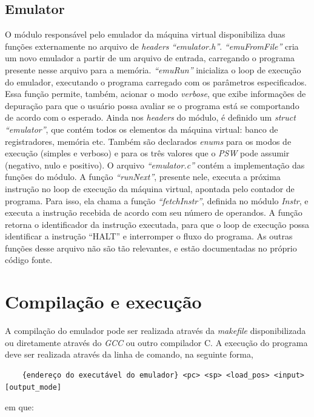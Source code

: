 \documentclass[10pt,a4paper]{article}
\numberwithin{equation}{section}
\begin{document}
\subsection{Emulator}

O módulo responsável pelo emulador da máquina virtual disponibiliza duas funções externamente no arquivo de \emph{headers} \emph{``emulator.h''}. \emph{``emuFromFile''} cria um novo emulador a partir de um arquivo de entrada, carregando o programa presente nesse arquivo para a memória. \emph{``emuRun''} inicializa o loop de execução do emulador, executando o programa carregado com os parâmetros especificados. Essa função permite, também, acionar o modo \emph{verbose}, que exibe informações de depuração para que o usuário possa avaliar se o programa está se comportando de acordo com o esperado.
Ainda nos \emph{headers} do módulo, é definido um \emph{struct} \emph{``emulator''}, que contém todos os elementos da máquina virtual: banco de registradores, memória etc. Também são declarados \emph{enums} para os modos de execução (simples e verboso) e para os três valores que o \emph{PSW} pode assumir (negativo, nulo e positivo).
O arquivo \emph{``emulator.c''} contém a implementação das funções do módulo. A função \emph{``runNext''}, presente nele, executa a próxima instrução no loop de execução da máquina virtual, apontada pelo contador de programa. Para isso, ela chama a função \emph{``fetchInstr''}, definida no módulo \emph{Instr}, e executa a instrução recebida de acordo com seu número de operandos. A função retorna o identificador da instrução executada, para que o loop de execução possa identificar a instrução ``HALT'' e interromper o fluxo do programa. As outras funções desse arquivo não são tão relevantes, e estão documentadas no próprio código fonte.

\section{Compilação e execução}

A compilação do emulador pode ser realizada através da \emph{makefile} disponibilizada ou diretamente através do \emph{GCC} ou outro compilador C. A execução do programa deve ser realizada através da linha de comando, na seguinte forma,

\begin{verbatim}
    {endereço do executável do emulador} <pc> <sp> <load_pos> <input> [output_mode]
\end{verbatim}

em que:
\end{document}
